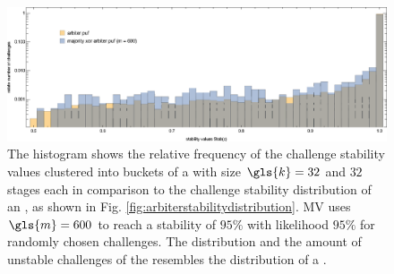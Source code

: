 \begin{figure}[ht]
\includegraphics[width=1.00\textwidth]{images/comparison-arbiter-stability-distribution-majority-xor-stability-distribution.eps}
\caption[Challenge stability distribution of a Majority \acs{XOR} \apuf]{The histogram shows the relative frequency of the challenge stability values clustered into buckets of a \mxpuf with size $\gls{k} = 32$ and $32$ stages each in comparison to the challenge stability distribution of an \apuf, as shown in Fig. \ref{fig:arbiterstabilitydistribution}. \ac{MV} uses $\gls{m} = 600$ to reach a stability of $95 \%$ with likelihood $95 \%$ for randomly chosen challenges. The distribution and the amount of unstable challenges of the \mxpuf resembles the distribution of a \apuf.} 
\label{fig:comparisonarbiterstabilitydistributionmajorityxorstabilitydistribution}
\end{figure}













